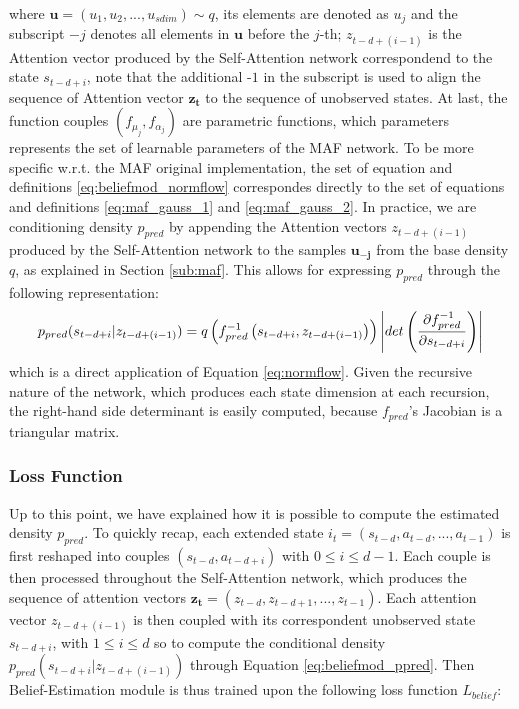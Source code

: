            where $\mathbf{u} = (u_1, u_2, ..., u_{sdim}) \sim q$, its elements are denoted as $u_j$ and the subscript $-j$ denotes all elements in $\mathbf{u}$ before the $j$-th; $z_{t-d+(i-1)}$ is the Attention vector produced by the Self-Attention network correspondend to the state $s_{t-d+i}$, note that the additional -$1$ in the subscript is used to align the sequence of Attention vector $\mathbf{z_t}$ to the sequence of unobserved states. At last, the function couples $(f_{\mu_j}, f_{\alpha_j})$ are parametric functions, which parameters represents the set of learnable parameters of the MAF network. To be more specific w.r.t. the MAF original implementation, the set of equation and definitions \ref{eq:beliefmod_normflow} correspondes directly to the set of equations and definitions \ref{eq:maf_gauss_1} and \ref{eq:maf_gauss_2}. \newline
            In practice, we are conditioning density $p_{pred}$ by appending the Attention vectors $z_{t-d+(i-1)}$ produced by the Self-Attention network to the samples $\mathbf{u_{-j}}$ from the base density $q$, as explained in Section \ref{sub:maf}. This allows for expressing $p_{pred}$ through the following representation:
            \begin{align}
                \label{eq:beliefmod_ppred}
                p_{pred} (s_{t-d+i} \vert z_{t-d+(i-1)}) = q \left( f_{pred}^{-1} \left(s_{t-d+i}, z_{t-d+(i-1)} \right) \right) \abs*{det \left( \frac{\partial f_{pred}^{-1}}{\partial s_{t-d+i}} \right)}
            \end{align}
            which is a direct application of Equation \ref{eq:normflow}. Given the recursive nature of the network, which produces each state dimension at each recursion, the right-hand side determinant is easily computed, because $f_{pred}$'s Jacobian is a triangular matrix.
            
            \subsubsection{Loss Function}
            Up to this point, we have explained how it is possible to compute the estimated density $p_{pred}$. To quickly recap, each extended state $i_t = (s_{t-d}, a_{t-d}, ..., a_{t-1})$ is first reshaped into couples $(s_{t-d}, a_{t-d+i})$ with $0 \leq i \leq d-1$. Each couple is then processed throughout the Self-Attention network, which produces the sequence of attention vectors $\mathbf{z_t} = (z_{t-d}, z_{t-d+1}, ..., z_{t-1})$. Each attention vector $z_{t-d+(i-1)}$ is then coupled with its correspondent unobserved state $s_{t-d+i}$, with $1 \leq i \leq d$ so to compute the conditional density $p_{pred} (s_{t-d+i} \vert z_{t-d+(i-1)})$ through Equation \ref{eq:beliefmod_ppred}. \newline
            Then Belief-Estimation module is thus trained upon the following loss function $L_{belief}$: 
            

